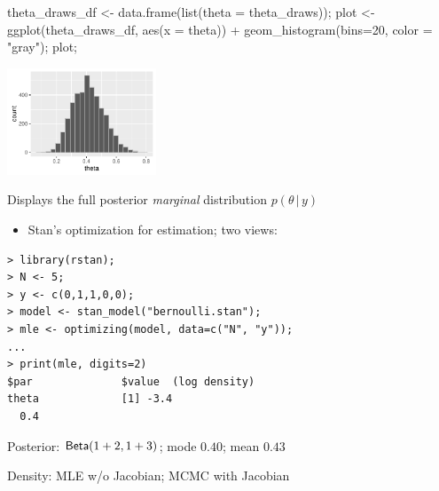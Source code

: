 \documentclass[10pt]{report}
\begin{document}
%
\begin{codein}
theta_draws_df <- data.frame(list(theta = theta_draws));
plot <-
  ggplot(theta_draws_df, aes(x = theta)) +
  geom_histogram(bins=20, color = "gray");
plot;
\end{codein}
\vspace*{-9pt}
\begin{center}
\includegraphics[height=1.25in]{img/bern-posterior-histogram.pdf}
\end{center}
\vspace*{-0.1in}
\begin{subitemize}
\item
Displays the full posterior {\slshape marginal} distribution $p(\theta \,
| \, y)$
\end{subitemize}



%
\begin{itemize}
\item Stan's optimization for estimation; two views:
\end{itemize}
\begin{center}
\begin{minipage}[t]{0.8\textwidth}\small
\begin{Verbatim}
> library(rstan);
> N <- 5;
> y <- c(0,1,1,0,0);
> model <- stan_model("bernoulli.stan");
> mle <- optimizing(model, data=c("N", "y"));
...
> print(mle, digits=2)
$par              $value  (log density)
theta             [1] -3.4
  0.4
\end{Verbatim}
\begin{subitemize}
\item Posterior: $\text{\sf Beta}(1+2, 1+3)$;  mode $0.40$; mean $0.43$
\item Density: MLE w/o Jacobian;  MCMC with Jacobian
\end{subitemize}
\end{minipage}
\end{center}
\end{document}
